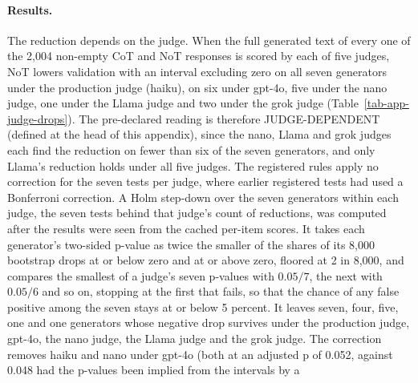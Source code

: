 \paragraph{Results.}
The reduction depends on the judge. When the full generated text of every one
of the 2,004 non-empty CoT and NoT responses is scored by each of five judges,
NoT lowers
validation with an interval excluding zero on all seven generators under the
production judge (haiku), on six under gpt-4o, five under the nano judge, one
under the Llama judge and two under the grok judge
(Table~\ref{tab-app-judge-drops}). The pre-declared reading is therefore
JUDGE-DEPENDENT (defined at the head of this appendix), since the nano, Llama
and grok judges each find the reduction on fewer than six of the seven
generators, and only Llama's reduction holds under all five judges.
The registered rules apply no correction for the seven tests per judge, where
earlier registered tests had used a Bonferroni correction. A Holm step-down
over the seven generators within each judge, the seven tests behind that
judge's count of reductions, was computed after the results were seen from
the cached per-item scores. It takes each generator's
two-sided p-value as twice the smaller of the shares of its 8,000 bootstrap
drops at or below zero and at or above zero, floored at 2 in 8,000, and
compares the smallest of a judge's seven p-values with $0.05/7$, the next
with $0.05/6$ and so on, stopping at the first that fails, so that the chance
of any false positive among the seven stays at or below 5 percent. It leaves
seven, four, five, one and one generators whose negative drop survives under
the production judge, gpt-4o, the nano judge, the Llama judge and the grok
judge. The
correction removes haiku and nano under gpt-4o (both at an adjusted p of
0.052, against 0.048 had the p-values been implied from the intervals by a
